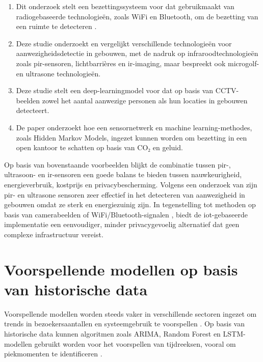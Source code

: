 \begin{enumerate}
    \item Dit onderzoek stelt een bezettingssysteem voor dat gebruikmaakt van radiogebaseerde technologieën, zoals WiFi en Bluetooth, om de bezetting van een ruimte te detecteren \autocite{Shahbazian2023}.
    
    \item Deze studie onderzoekt en vergelijkt verschillende technologieën voor aanwezigheidsdetectie in gebouwen, met de nadruk op infraroodtechnologieën zoals \gls{pir}-sensoren, lichtbarrières en \gls{ir}-imaging, maar bespreekt ook microgolf- en ultrasone technologieën. \autocite{Maaspuro2018}
    
    \item Deze studie stelt een deep-learningmodel voor dat op basis van CCTV-beelden zowel het aantal aanwezige personen als hun locaties in gebouwen detecteert. \autocite{Hu2023}
    
    \item De paper onderzoekt hoe een sensornetwerk en machine learning-methodes, zoals Hidden Markov Models, ingezet kunnen worden om bezetting in een open kantoor te schatten op basis van CO₂ en geluid. \autocite{Lam2009}
\end{enumerate}

Op basis van bovenstaande voorbeelden blijkt de combinatie tussen \gls{pir}-, ultrasoon- en \gls{ir}-sensoren een goede balans te bieden tussen nauwkeurigheid, energieverbruik, kostprijs en privacybescherming. Volgens een onderzoek van \autocite{Maaspuro2018} zijn \gls{pir}- en ultrasone sensoren zeer effectief in het detecteren van aanwezigheid in gebouwen omdat ze sterk en energiezuinig zijn. In tegenstelling tot methoden op basis van camerabeelden of WiFi/Bluetooth-signalen \autocite{Hu2023, Shahbazian2023}, biedt de \gls{iot}-gebaseerde implementatie een eenvoudiger, minder privacygevoelig alternatief dat geen complexe infrastructuur vereist.

\section{Voorspellende modellen op basis van historische data}
Voorspellende modellen worden steeds vaker in verschillende sectoren ingezet om trends in bezoekersaantallen en systeemgebruik te voorspellen \autocite{Ejstrud2006}. Op basis van historische data kunnen algoritmen zoals ARIMA, Random Forest en LSTM-modellen gebruikt worden voor het voorspellen van tijdreeksen, vooral om piekmomenten te identificeren \autocite{Park_2024}. 

